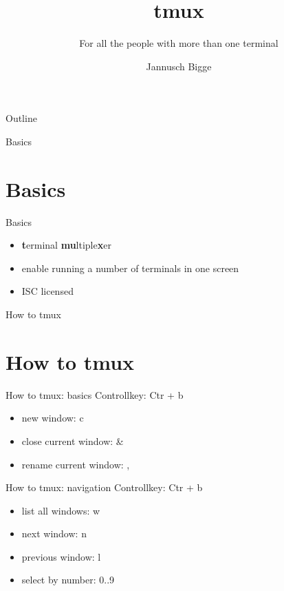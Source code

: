 \documentclass[10pt,graphics,aspectratio=169,table]{beamer}
\title{tmux}
\subtitle{For all the people with more than one terminal}
\author{Jannusch Bigge}
\begin{document}
\begin{frame}
    \maketitle
\end{frame}

\begin{frame}{Outline}
    \tableofcontents
\end{frame}

\begin{frame}{Basics}
    \section{Basics}
\end{frame}

\begin{frame}{Basics}
    \begin{itemize}
        \item \textbf{t}erminal \textbf{mu}ltiple\textbf{x}er
        \item enable running a number of terminals in one screen
        \item ISC licensed
    \end{itemize}
\end{frame}

\begin{frame}{How to tmux}
    \section{How to tmux}
\end{frame}

\begin{frame}{How to tmux: basics}
    Controllkey: Ctr + b
    \begin{itemize}
        \item new window: c
        \item close current window: \&
        \item rename current window: ,
    \end{itemize}
\end{frame}

\begin{frame}{How to tmux: navigation}
    Controllkey: Ctr + b
    \begin{itemize}
        \item list all windows: w
        \item next window: n
        \item previous window: l 
        \item select by number: 0..9
    \end{itemize}
\end{frame}
\end{document}
